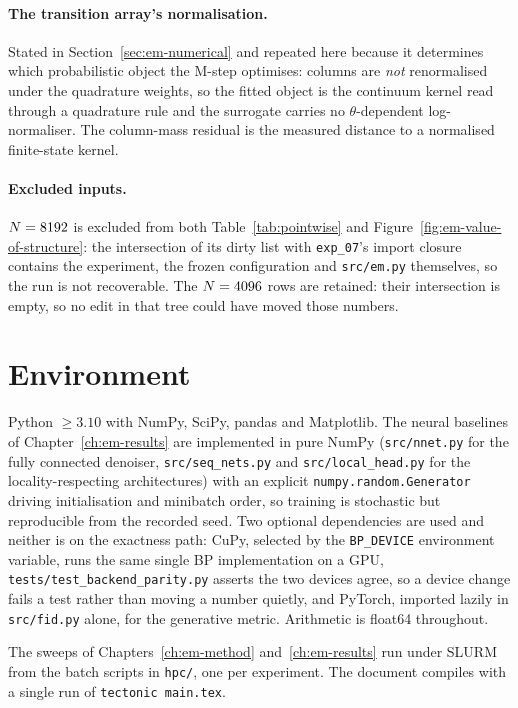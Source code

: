 \paragraph{The transition array's normalisation.} Stated in
Section~\ref{sec:em-numerical} and repeated here because it determines which
probabilistic object the M-step optimises: columns are \emph{not} renormalised
under the quadrature weights, so the fitted object is the continuum kernel read
through a quadrature rule and the surrogate carries no $\theta$-dependent
log-normaliser. The column-mass residual is the measured distance to a
normalised finite-state kernel.

\paragraph{Excluded inputs.} $N=8192$ is excluded from both
Table~\ref{tab:pointwise} and Figure~\ref{fig:em-value-of-structure}: the
intersection of its dirty list with \texttt{exp\_07}'s import closure
contains the experiment, the frozen configuration and \texttt{src/em.py}
themselves, so the run is not recoverable. The $N=4096$ rows are
retained: their intersection is empty, so no edit in that tree could have
moved those numbers.

\section{Environment}

Python $\geq 3.10$ with NumPy, SciPy, pandas and Matplotlib. The neural
baselines of Chapter~\ref{ch:em-results} are implemented in pure NumPy
(\texttt{src/nnet.py} for the fully connected denoiser,
\texttt{src/seq\_nets.py} and \texttt{src/local\_head.py} for the
locality-respecting architectures) with an explicit
\texttt{numpy.random.Generator} driving initialisation and minibatch order,
so training is stochastic but reproducible from the recorded seed. Two
optional dependencies are used and neither is on the exactness path: CuPy,
selected by the \texttt{BP\_DEVICE} environment variable, runs the same
single BP implementation on a GPU, \texttt{tests/test\_backend\_parity.py}
asserts the two devices agree, so a device change fails a test rather than
moving a number quietly, and PyTorch, imported lazily in
\texttt{src/fid.py} alone, for the generative metric. Arithmetic is float64
throughout.

The sweeps of Chapters~\ref{ch:em-method} and~\ref{ch:em-results} run under
SLURM from the batch scripts in \texttt{hpc/}, one per experiment. The
document compiles with a single run of \texttt{tectonic main.tex}.

